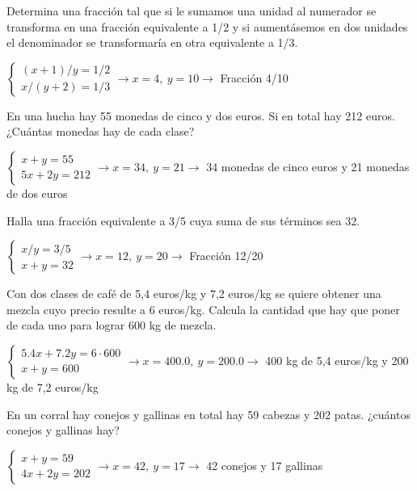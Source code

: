 \documentclass[spanish, 12pt]{exam}
\begin{document}
\begin{questions}
\question Determina una fracción tal que si le sumamos una unidad al numerador se transforma en una fracción equivalente a 1/2 y si aumentásemos en dos unidades el denominador se transformaría en otra equivalente a 1/3.

\begin{solution} $\left\{\begin{matrix}(x+1)/y=1/2 \\ x/(y+2)=1/3\end{matrix}\right. \to  x = 4, \  y = 10 \to$ Fracción 4/10 \end{solution}

\question En una hucha hay 55 monedas de cinco y dos euros. Si en total hay 212 euros. ¿Cuántas monedas hay de cada clase?
\begin{solution} $\left\{\begin{matrix}x+y=55 \\ 5x+2y=212\end{matrix}\right. \to  x = 34, \  y = 21 \to$ 34 monedas de cinco euros y 21 monedas de dos euros \end{solution}

\question Halla una fracción equivalente a 3/5 cuya suma de sus términos sea 32.
\begin{solution} $\left\{\begin{matrix}x/y=3/5 \\ x+y=32\end{matrix}\right. \to  x = 12, \  y = 20 \to$ Fracción 12/20 \end{solution}

\question Con dos clases de café de 5,4 euros/kg y 7,2 euros/kg se quiere obtener una mezcla cuyo precio resulte a 6 euros/kg. Calcula la cantidad que hay que poner de cada uno para lograr 600 kg de mezcla.

\begin{solution} $\left\{\begin{matrix}5.4x+7.2y=6 \cdot 600 \\ x+y=600\end{matrix}\right. \to  x = 400.0, \  y = 200.0 \to$ 400 kg de 5,4 euros/kg y 200 kg de 7,2 euros/kg \end{solution}

\question En un corral hay conejos y gallinas en total hay 59 cabezas y 202 patas. ¿cuántos conejos y gallinas hay?
\begin{solution} $\left\{\begin{matrix}x+y=59 \\ 4x+2y=202\end{matrix}\right. \to  x = 42, \  y = 17 \to$ 42 conejos y 17 gallinas \end{solution}


\end{questions}
\end{document}
